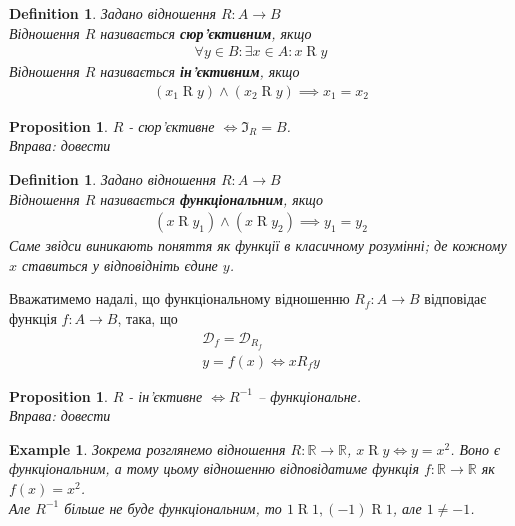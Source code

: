 \documentclass[a4paper, 14pt]{extarticle}
\theoremstyle{theoremdd}
\theoremstyle{theoremdd}
\newtheorem{definition}[theorem]{Definition}
\theoremstyle{theoremdd}
\theoremstyle{theoremdd}
\theoremstyle{theoremdd}
\newtheorem{example}[theorem]{Example}
\theoremstyle{theoremdd}
\theoremstyle{theoremdd}
\theoremstyle{theoremdd}
\theoremstyle{theoremdd}
\newtheorem{proposition}[theorem]{Proposition}
\theoremstyle{theoremdd}
\theoremstyle{theoremdd}
\theoremstyle{theoremdd}
\theoremstyle{theoremdd}
\theoremstyle{theoremdd}
\theoremstyle{theoremdd}
\begin{document}
\begin{definition}
Задано відношення $R \colon A \to B$\\
Відношення $R$ називається \textbf{сюр'єктивним}, якщо
\begin{align*}
\forall y \in B: \exists x \in A: x \mathrel{R} y
\end{align*}
Відношення $R$ називається \textbf{ін'єктивним}, якщо
\begin{align*}
(x_1 \mathrel{R} y) \wedge (x_2 \mathrel{R} y) \implies x_1 = x_2
\end{align*}
\end{definition}

\begin{proposition}
$R$ - сюр'єктивне $\iff \Im_R = B$.\\
\textit{Вправа: довести}
\end{proposition}

\begin{definition}
Задано відношення $R \colon A \to B$\\
Відношення $R$ називається \textbf{функціональним}, якщо
\begin{align*}
(x \mathrel{R} y_1) \wedge (x \mathrel{R} y_2) \implies y_1 = y_2
\end{align*}
Саме звідси виникають поняття як функції в класичному розумінні; де кожному $x$ ставиться у відповідніть єдине $y$.
\end{definition}

Вважатимемо надалі, що функціональному відношенню $R_f \colon A \to B$ відповідає функція $f \colon A \to B$, така, що
\begin{align*}
\mathcal{D}_f = \mathcal{D}_{R_f} \\
y = f(x) \iff x \mathrel{R_f} y
\end{align*}

\begin{proposition}
$R$ - ін'єктивне $\iff R^{-1}$ -- функціональне.\\
\textit{Вправа: довести}
\end{proposition}

\begin{example}
Зокрема розглянемо відношення $R \colon \mathbb{R} \to \mathbb{R}$, $x \mathrel{R} y \iff y = x^2$. Воно є функціональним, а тому цьому відношенню відповідатиме функція $f \colon \mathbb{R} \to \mathbb{R}$ як $f(x) = x^2$.\\
Але $R^{-1}$ більше не буде функціональним, то $1 \mathrel{R} 1, (-1) \mathrel{R} 1$, але $1 \neq -1$.
\end{example}
\end{document}
